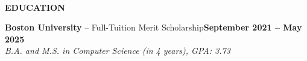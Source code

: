 \documentclass[10pt,letterpaper]{article}
\newcommand{\redline}{\vspace{0pt}{\color{red!80!black}\rule{\textwidth}{0.5pt}}\\}
\begin{document}
\redline
\begin{minipage}[t]{0.15\textwidth}
\vspace{0pt}
{\normalsize\bfseries\color{red!80!black}EDUCATION}
\end{minipage}
\hspace{0.04\textwidth}
\begin{minipage}[t]{0.8\textwidth}
  \vspace{0pt}
  \textbf{Boston University} -- Full-Tuition Merit Scholarship\hfill \textbf{September 2021 -- May 2025}\\
  \textit{B.A. and M.S. in Computer Science (in 4 years), GPA: 3.73}
\end{minipage}

\vspace{8pt}
\end{document}
